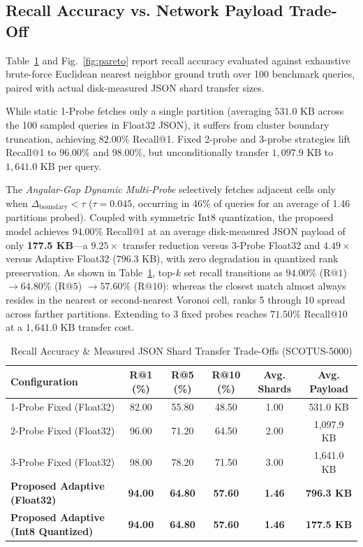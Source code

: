 \documentclass[11pt,journal,compsoc,onecolumn]{IEEEtran}
\begin{document}
\subsection{Recall Accuracy vs. Network Payload Trade-Off}
Table~\ref{tab:recall} and Fig.~\ref{fig:pareto} report recall accuracy evaluated against exhaustive brute-force Euclidean nearest neighbor ground truth over 100 benchmark queries, paired with actual disk-measured JSON shard transfer sizes.

While static 1-Probe fetches only a single partition (averaging $531.0\text{ KB}$ across the 100 sampled queries in Float32 JSON), it suffers from cluster boundary truncation, achieving $82.00\%$ Recall@1. Fixed 2-probe and 3-probe strategies lift Recall@1 to $96.00\%$ and $98.00\%$, but unconditionally transfer $1,097.9\text{ KB}$ to $1,641.0\text{ KB}$ per query.

The \textit{Angular-Gap Dynamic Multi-Probe} selectively fetches adjacent cells only when $\Delta_{\text{boundary}} < \tau$ ($\tau = 0.045$, occurring in 46\% of queries for an average of 1.46 partitions probed). Coupled with symmetric $\text{Int8}$ quantization, the proposed model achieves $94.00\%$ Recall@1 at an average disk-measured JSON payload of only \textbf{177.5 KB}---a $9.25\times$ transfer reduction versus 3-Probe Float32 and $4.49\times$ versus Adaptive Float32 ($796.3\text{ KB}$), with zero degradation in quantized rank preservation. As shown in Table~\ref{tab:recall}, top-$k$ set recall transitions as $94.00\%$ ($\text{R}@1$) $\to 64.80\%$ ($\text{R}@5$) $\to 57.60\%$ ($\text{R}@10$): whereas the closest match almost always resides in the nearest or second-nearest Voronoi cell, ranks 5 through 10 spread across farther partitions. Extending to 3 fixed probes reaches $71.50\%$ Recall@10 at a $1,641.0\text{ KB}$ transfer cost.

\begin{table}[H]
\centering
\caption{Recall Accuracy \& Measured JSON Shard Transfer Trade-Offs (SCOTUS-5000)}
\label{tab:recall}
\vspace{2pt}
\begin{tabular}{lccccc}
\toprule
\textbf{Configuration} & \textbf{R@1 (\%)} & \textbf{R@5 (\%)} & \textbf{R@10 (\%)} & \textbf{Avg. Shards} & \textbf{Avg. Payload} \\
\midrule
1-Probe Fixed (Float32) & 82.00 & 55.80 & 48.50 & 1.00 & 531.0 KB \\
2-Probe Fixed (Float32) & 96.00 & 71.20 & 64.50 & 2.00 & 1,097.9 KB \\
3-Probe Fixed (Float32) & 98.00 & 78.20 & 71.50 & 3.00 & 1,641.0 KB \\
\textbf{Proposed Adaptive (Float32)} & \textbf{94.00} & \textbf{64.80} & \textbf{57.60} & \textbf{1.46} & \textbf{796.3 KB} \\
\textbf{Proposed Adaptive (Int8 Quantized)} & \textbf{94.00} & \textbf{64.80} & \textbf{57.60} & \textbf{1.46} & \textbf{177.5 KB} \\
\bottomrule
\end{tabular}
\end{table}
\end{document}
